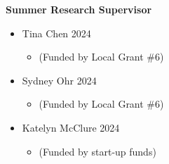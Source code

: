 \documentclass[margin]{res}
\begin{document}
\begin{resume}


\textbf{Summer Research Supervisor}
\begin{itemize}
\item Tina Chen \hfill 2024
	\begin{itemize}[leftmargin=-0in] \vspace{-0.2cm}
	\item[]\begin{footnotesize}(Funded by Local Grant \#6) \end{footnotesize}
	\end{itemize}
	
\item Sydney Ohr \hfill 2024 
	\begin{itemize}[leftmargin=-0in] \vspace{-0.2cm}
	\item[]\begin{footnotesize}(Funded by Local Grant \#6) \end{footnotesize}
	\end{itemize}
	
\item Katelyn McClure \hfill 2024 
	\begin{itemize}[leftmargin=-0in] \vspace{-0.2cm}
	\item[]\begin{footnotesize}(Funded by start-up funds) \end{footnotesize}
	\end{itemize}


\end{itemize}
\end{resume}
\end{document}

